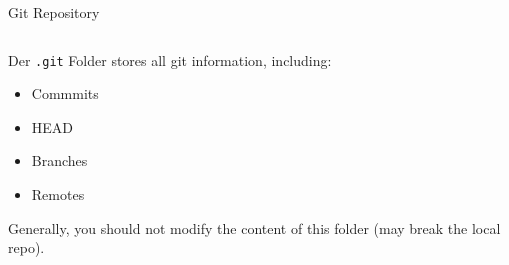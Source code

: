 \documentclass{setbeamer}
\newenvironment{mydirtree}[1][]{
    \begin{tikzpicture}[
        grow via three points = {one child at (0.3,-0.7) and two children at (0.3,-0.7) and (0.3,-1.3)},
        edge from parent path = {(\tikzparentnode.south) circle |- (\tikzchildnode.west)},
        every node/.style = {anchor=west},
        #1
    ]
}{
    \end{tikzpicture}
}
\begin{document}
\begin{frame}[fragile,t]{Git Repository}
    \begin{columns}[c]
        \begin{column}{0.5\textwidth}
        \end{column}

        \begin{column}{0.5\textwidth}
        \end{column}
    \end{columns}

    \vspace{3mm}
    Der \verb|.git| Folder stores all git information, including:
    \begin{itemize}
        \item Commmits
        \item HEAD
        \item Branches
        \item Remotes
    \end{itemize}

    \vspace{3mm}
    Generally, you should not modify the content of this folder (may break the local repo).
\end{frame}
\end{document}
